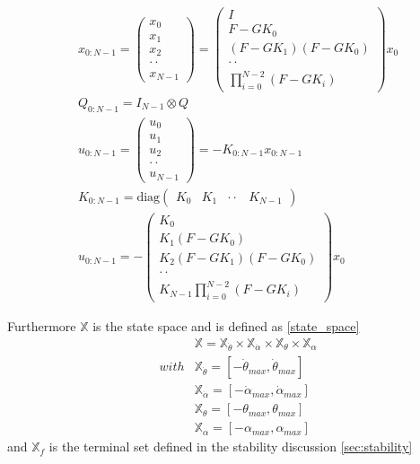 \begin{align} \label{vec_def}
& x_{0:N-1} = \left( \begin{matrix}
    x_0 \\ x_1 \\ x_2 \\ \cdot \cdot \\ x_{N-1}
\end{matrix}\right) =
 \left( \begin{matrix}
    I \\ F-G K_0 \\  (F-G K_1)(F-G K_0) \\ \cdot \cdot\\ \prod_{i=0}^{N-2}(F - G K_i)
\end{matrix}\right) x_0 \\
& Q_{0:N-1} = I_{N-1} \otimes Q \\
& u_{0:N-1} = \left( \begin{matrix}
    u_0 \\ u_1 \\ u_2 \\ \cdot \cdot \\ u_{N-1}
\end{matrix}\right) =
-K_{0:N-1} x_{0:N-1}\\
& K_{0:N-1} = \mathrm{diag}\left( \begin{matrix}
    K_0 & K_1 & \cdot \cdot & K_{N-1}
\end{matrix}\right) \\
& u_{0:N-1}=- 
 \left( \begin{matrix}
    K_0 \\ K_1(F-G K_0) \\  K_2(F-G K_1)(F-G K_0) \\ \cdot \cdot\\ K_{N-1}\prod_{i=0}^{N-2}(F - G K_i)
\end{matrix}\right) x_0 
\end{align}

Furthermore $\mathbb{X}$ is the state space and is defined as \autoref{state_space}
\begin{align}\label{state_space}
    &&\mathbb{X} = \mathbb{X}_{\dot\theta} \times\mathbb{X}_{\dot\alpha} \times \mathbb{X}_\theta \times \mathbb{X}_\alpha \\
    & with & \mathbb{X}_\dot\theta  = [-\dot\theta_{max},\dot\theta_{max}] \\
    && \mathbb{X}_\dot\alpha = [-\dot\alpha_{max},\dot\alpha_{max}] \\
    && \mathbb{X}_\theta  = [-\theta_{max},\theta_{max}] \\
    && \mathbb{X}_\alpha = [-\alpha_{max},\alpha_{max}]
\end{align}
and $\mathbb{X}_f$ is the terminal set defined in the stability discussion \autoref{sec:stability}

